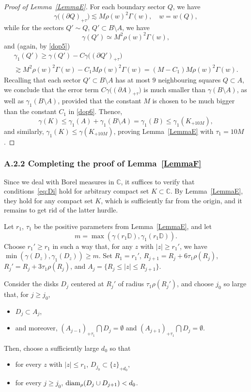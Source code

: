\documentclass[11pt]{amsart}
\numberwithin{equation}{section}
\newcommand{\bC}{\mathbb C}
\newcommand{\bD}{\mathbb D}
\begin{document}
\begin{proof}[Proof of Lemma~\ref{LemmaE}]
For each boundary sector $Q$, we have
\[
\gamma \bigl( (\partial Q)_{+\tau} \bigr) \lesssim M\rho(w)^2\Gamma(w),
\quad w=w(Q),
\]
while for the sectors $Q'\sim Q$, $Q'\subset B\setminus A$, we have
\[
\gamma (Q') \simeq M^2 \rho(w)^2 \Gamma (w),
\]
and (again, by \eqref{dop5})
\begin{multline}
\label{dop6}
\gamma_1(Q') \ge \gamma(Q') - C\gamma\bigl( (\partial Q')_{+\tau} \bigr) \\
\gtrsim M^2\rho(w)^2\Gamma (w) - C_1 M\rho(w)^2\Gamma (w) = (M-C_1)M\rho(w)^2\Gamma (w).
\end{multline}
Recalling that each sector $Q'\subset B\setminus A$ has at most $9$ neighbouring squares $Q\subset A$, we conclude that the error term $C\gamma \bigl( (\partial A)_{+\tau} \bigr)$ is much smaller than
$\gamma (B\setminus A)$, as well as $\gamma_1(B\setminus A)$, provided that the constant $M$ is chosen to be much bigger than the constant $C_1$ in \eqref{dop6}. Thence,
\[
\gamma (K) \le \gamma_1(A) + \gamma_1(B\setminus A) = \gamma_1(B) \le \gamma_1(K_{+10M}),
\]
and similarly, $\gamma_1 (K) \le \gamma (K_{+10M})$, proving Lemma~\ref{LemmaE} with $\tau_1=10M$. 
\end{proof}

\subsubsection*{A.2.2 Completing the proof of Lemma~\ref{LemmaF}}

Since we deal with Borel measures in $\bC$, it suffices to verify that
conditions~\eqref{eq:Di} hold for arbitrary compact set $K\subset \bC$.
By Lemma~\ref{LemmaE}, they hold for any compact set $K$,
which is sufficiently far from the origin, and it remains to get rid of the
latter hurdle.

Let $r_1$, $\tau_1$ be the positive parameters from Lemma~\ref{LemmaE}, and let
\[
m = \max( \gamma(r_1\bD), \gamma_1 (r_1\bD) ).
\]
Choose $r_1'\ge r_1$ in such a way that, for any $z$ with
$|z|\ge r_1'$, we have $\min(\gamma(D_z), \gamma_1(D_z)) \ge m $.
Set $R_1=r_1'$, $R_{j+1}=R_j+6\tau_1\rho(R_j)$, $R_j' = R_j+3\tau_1\rho(R_j)$, and
$A_j = \{R_j \le |z| \le R_{j+1}\}$.

Consider the disks
$D_j$ centered at $R_j'$ of radius $\tau_1 \rho(R_j')$, and choose
$j_0$ so large that, for $j\ge j_0$,
\begin{itemize}
\item
$D_j \subset A_j$,
\item and moreover,
$(A_{j-1})_{+\tau_1} \bigcap D_j = \emptyset$ and $(A_{j+1})_{+\tau_1} \bigcap D_j = \emptyset$.
\end{itemize}
Then, choose a sufficiently large $d_0$ so that
\begin{itemize}
\item for every $z$ with $|z|\le r_1$,
$D_{j_0}\subset \{z\}_{+d_0}$,
\item for every $j\ge j_0$, ${\rm diam}_\rho (D_j \cup D_{j+1}) < d_0$.
\end{itemize}
\end{document}
